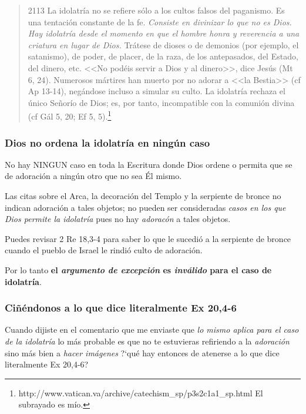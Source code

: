 \documentclass{article}
\begin{document}
\begin{quote}
2113 La idolatría no se refiere sólo a los cultos falsos del paganismo. Es una tentación constante de la fe. \emph{Consiste en divinizar lo que no es Dios. Hay idolatría desde el momento en que el hombre honra y reverencia a una criatura en lugar de Dios.} Trátese de dioses o de demonios (por ejemplo, el satanismo), de poder, de placer, de la raza, de los antepasados, del Estado, del dinero, etc. <<No podéis servir a Dios y al dinero>>, dice Jesús (Mt 6, 24). Numerosos mártires han muerto por no adorar a <<la Bestia>> (cf Ap 13-14), negándose incluso a simular su culto. La idolatría rechaza el único Señorío de Dios; es, por tanto, incompatible con la comunión divina (cf Gál 5, 20; Ef 5, 5).\footnote{http://www.vatican.va/archive/catechism\_sp/p3s2c1a1\_sp.html El subrayado es m\'{i}o.}
\end{quote}

\subsubsection{Dios no ordena la idolatr\'{i}a en ning\'un caso}

No hay NINGUN caso en toda la Escritura donde Dios ordene o permita que se de adoraci\'on a ning\'un otro que no sea \'El mismo.

Las citas sobre el Arca, la decoraci\'on del Templo y la serpiente de bronce no indican adoraci\'on a tales objetos; no pueden ser consideradas \emph{casos en los que Dios permite la idolatr\'{i}a} pues no hay \emph{adorac\'on} a tales objetos.

Puedes revisar 2 Re 18,3-4 para saber lo que le sucedi\'o a la serpiente de bronce cuando el pueblo de Israel le rindi\'o culto de adoraci\'on.

Por lo tanto \textbf{el \emph{argumento de excepci\'on} es \emph{inv\'alido} para el caso de idolatr\'{i}a}.

\subsubsection{Ci\~n\'endonos a lo que dice literalmente Ex 20,4-6}

Cuando dijiste en el comentario que me enviaste que \emph{lo mismo aplica para el caso de la idolatr\'{i}a} lo m\'as probable es que no te estuvieras refiriendo a la \emph{adoraci\'on} sino más bien a \emph{hacer imágenes}  ?`qu\'e hay entonces de atenerse a lo que dice literalmente Ex 20,4-6?
\end{document}
